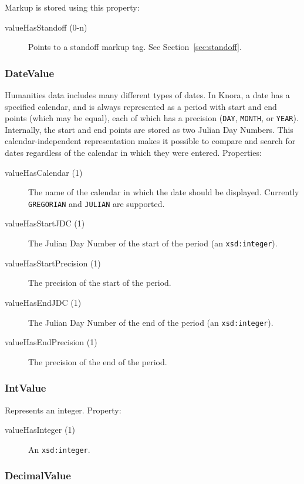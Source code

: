 \documentclass[12pt, a4paper]{article}
\begin{document}
Markup is stored using this property:

\begin{description}
	\item[valueHasStandoff (0-n)] Points to a standoff markup tag. See Section~\ref{sec:standoff}.
\end{description}

\subsubsection{DateValue}

Humanities data includes many different types of dates. In Knora, a date has a specified calendar, and is always represented as a period with start and end points (which may be equal), each of which has a precision (\texttt{DAY}, \texttt{MONTH}, or \texttt{YEAR}). Internally, the start and end points are stored as two Julian Day Numbers. This calendar-independent representation makes it possible to compare and search for dates regardless of the calendar in which they were entered. Properties:

\begin{description}
	\item[valueHasCalendar (1)] The name of the calendar in which the date should be displayed. Currently \texttt{GREGORIAN} and \texttt{JULIAN} are supported.
	\item[valueHasStartJDC (1)] The Julian Day Number of the start of the period (an \texttt{xsd:integer}).
	\item[valueHasStartPrecision (1)] The precision of the start of the period.
	\item[valueHasEndJDC (1)] The Julian Day Number of the end of the period (an \texttt{xsd:integer}).
	\item[valueHasEndPrecision (1)] The precision of the end of the period.
\end{description}

\subsubsection{IntValue}

Represents an integer. Property:

\begin{description}
	\item[valueHasInteger (1)] An \texttt{xsd:integer}.
\end{description}

\subsubsection{DecimalValue}
\end{document}
